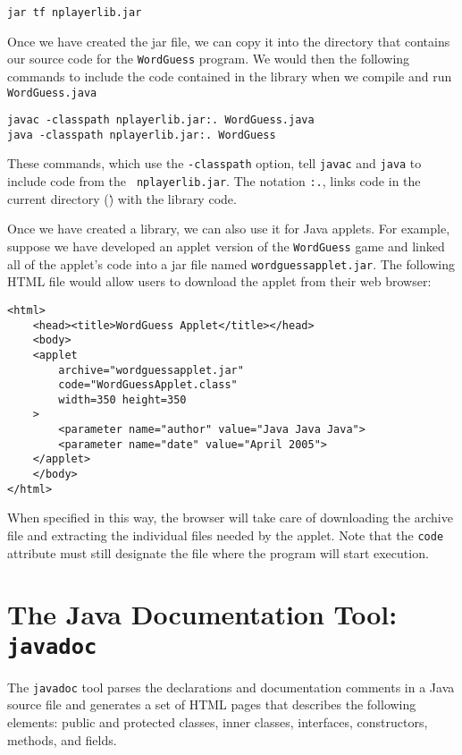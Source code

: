 \begin{jjjlisting}
\begin{lstlisting}
jar tf nplayerlib.jar
\end{lstlisting}
\end{jjjlisting}

\noindent Once we have created the jar file, we can copy it into the
directory that contains our source code for the {\tt WordGuess}
program.  We would then the following commands to include the code
contained in the library when we compile and run {\tt WordGuess.java}

\begin{jjjlisting}
\begin{lstlisting}
javac -classpath nplayerlib.jar:. WordGuess.java
java -classpath nplayerlib.jar:. WordGuess
\end{lstlisting}
\end{jjjlisting}

\noindent These commands, which use the {\tt -classpath} option,
tell {\tt javac} and {\tt java} to include code from the {\tt
nplayerlib.jar}. The notation \verb|:.|, links code in the current
directory (\.) with the library code.

Once we have created a library, we can also use it for
Java applets.  For example, suppose we have developed an applet
version of the {\tt WordGuess}  game and linked all of the
applet's code into a jar file named {\tt wordguessapplet.jar}.
The following HTML file would allow users to download the applet
from their web browser:

\begin{jjjlisting}
\begin{lstlisting}
<html>
    <head><title>WordGuess Applet</title></head>
    <body>
    <applet
        archive="wordguessapplet.jar"
        code="WordGuessApplet.class"
        width=350 height=350
    >
        <parameter name="author" value="Java Java Java">
        <parameter name="date" value="April 2005">
    </applet>
    </body>
</html>
\end{lstlisting}
\end{jjjlisting}

\noindent When specified in this way, the browser will take care
of downloading the archive file and extracting the individual files
needed by the applet.  Note that the {\tt code} attribute must still
designate the file where the program will start execution.

\section*{The Java Documentation Tool: {\tt javadoc}}
\noindent The {\tt javadoc} tool parses the declarations and documentation
comments in a Java source file and generates a set of HTML pages that
describes the following elements: public and protected classes, inner
classes, interfaces, constructors, methods, and fields.

